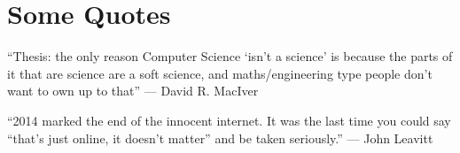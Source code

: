 


\usepackage[
    hidelinks,          %
    pdfusetitle,        %
    pdfdisplaydoctitle, %
    bookmarksnumbered,  %
    pdfpagemode={UseOutlines},  %
    pdfstartview={FitV},        %
]{hyperref}



\section{Some Quotes}

\enquote{Thesis: the only reason Computer Science \enquote{isn't a science} is because the parts of it that are science are a soft science, and maths/engineering type people don't want to own up to that}
--- David R. MacIver \parencite*{maciverThesisOnlyReason2018}

\enquote{2014 marked the end of the innocent internet. It was the last time you could say “that’s just online, it doesn’t matter” and be taken seriously.}
--- John Leavitt \parencite*{leavittInnocentInternetDied2019}

\printbibliography[notkeyword=Tweet]
\printbibliography[keyword=Tweet,title={Referenced Tweets}]


